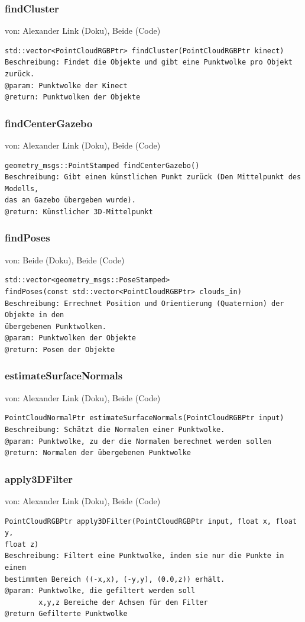 \documentclass{suturo}
\makeatletter
\newcommand{\chapterauthor}[1]{%
  {\parindent0pt\vspace*{-27pt}%
  \linespread{0}\small\begin{flushright}von: #1\end{flushright}%
  \par\nobreak\vspace*{0pt}}
  \@afterheading%
}
\makeatother
\begin{document}
\subsubsection{findCluster}
\chapterauthor{Alexander Link (Doku), Beide (Code)}
\begin{verbatim}
std::vector<PointCloudRGBPtr> findCluster(PointCloudRGBPtr kinect)
Beschreibung: Findet die Objekte und gibt eine Punktwolke pro Objekt zurück.
@param: Punktwolke der Kinect
@return: Punktwolken der Objekte
\end{verbatim}\label{func:findcluster}

\subsubsection{findCenterGazebo}
\chapterauthor{Alexander Link (Doku), Beide (Code)}
\begin{verbatim}
geometry_msgs::PointStamped findCenterGazebo()
Beschreibung: Gibt einen künstlichen Punkt zurück (Den Mittelpunkt des
Modells, 
das an Gazebo übergeben wurde).
@return: Künstlicher 3D-Mittelpunkt
\end{verbatim}\label{func:findcentergazebo}


\subsubsection{findPoses}
\chapterauthor{Beide (Doku), Beide (Code)}
\begin{verbatim}
std::vector<geometry_msgs::PoseStamped> 
findPoses(const std::vector<PointCloudRGBPtr> clouds_in)
Beschreibung: Errechnet Position und Orientierung (Quaternion) der Objekte in den
übergebenen Punktwolken.
@param: Punktwolken der Objekte
@return: Posen der Objekte
\end{verbatim}\label{func:findposes}

\subsubsection{estimateSurfaceNormals}
\chapterauthor{Alexander Link (Doku), Beide (Code)}
\begin{verbatim}
PointCloudNormalPtr estimateSurfaceNormals(PointCloudRGBPtr input)
Beschreibung: Schätzt die Normalen einer Punktwolke.
@param: Punktwolke, zu der die Normalen berechnet werden sollen
@return: Normalen der übergebenen Punktwolke
\end{verbatim}\label{func:estimatesurfacenormals}

\subsubsection{apply3DFilter}
\chapterauthor{Alexander Link (Doku), Beide (Code)}
\begin{verbatim}
PointCloudRGBPtr apply3DFilter(PointCloudRGBPtr input, float x, float y, 
float z)
Beschreibung: Filtert eine Punktwolke, indem sie nur die Punkte in einem
bestimmten Bereich ((-x,x), (-y,y), (0.0,z)) erhält.
@param: Punktwolke, die gefiltert werden soll
		x,y,z Bereiche der Achsen für den Filter
@return Gefilterte Punktwolke
\end{verbatim}\label{func:apply3dfilter}
\end{document}
